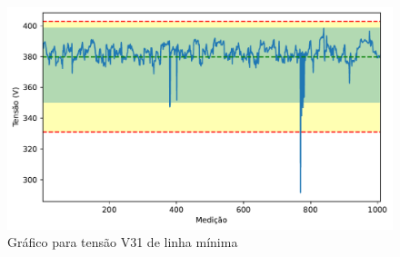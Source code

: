 \begin{figure}[H]
	\centering
	\caption{Gráfico para tensão V31 de linha mínima}
    \includegraphics[width=16cm]{illustrations/figures/a2_V31_Min.pdf}
\end{figure}

